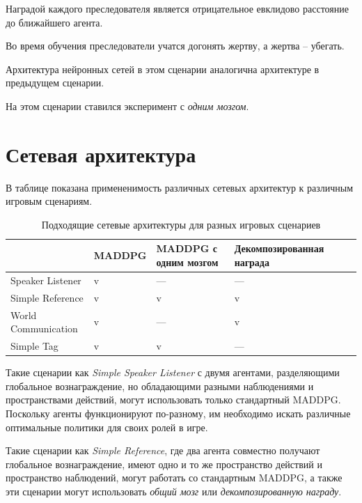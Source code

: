 Наградой каждого преследователя является отрицательное евклидово расстояние до ближайшего агента.

Во время обучения преследователи учатся догонять жертву, а жертва – убегать.

Архитектура нейронных сетей в этом сценарии аналогична архитектуре в предыдущем сценарии.

На этом сценарии ставился эксперимент с \textit{одним мозгом}.


\section{Сетевая архитектура} \label{network-architecture}

В таблице  показана примененимость различных сетевых архитектур к различным игровым сценариям.

\begin{table}[t!]
    \centering\small
    \caption{Подходящие сетевые архитектуры для разных игровых сценариев}
    \label{tab-algs-application}
    \begin{tabular}{|l|l|l|l|l|l|}
        \hline
        & MADDPG & MADDPG с одним мозгом & Декомпозированная награда \\
        \hline
        Speaker Listener    & v      & ---                   & ---                       \\ \hline
        Simple Reference    & v      & v                     & v                         \\ \hline
        World Communication & v      & ---                   & v                         \\ \hline
        Simple Tag          & v      & v                     & ---                       \\ \hline
    \end{tabular}
    \normalsize%
\end{table}

Такие сценарии как \textit{Simple Speaker Listener} с двумя агентами, разделяющими глобальное вознаграждение, но обладающими разными наблюдениями и пространствами действий, могут использовать только стандартный MADDPG. Поскольку агенты функционируют по-разному, им необходимо искать различные оптимальные политики для своих ролей в игре.

Такие сценарии как \textit{Simple Reference}, где два агента совместно получают глобальное вознаграждение, имеют одно и то же пространство действий и пространство наблюдений, могут работать со стандартным MADDPG, а также эти сценарии могут использовать \textit{общий мозг} или \textit{декомпозированную награду}.

